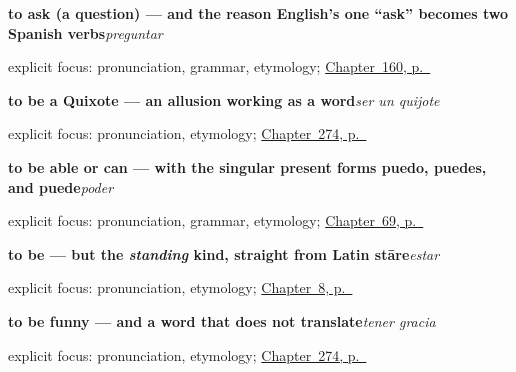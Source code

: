 \noindent\begin{minipage}[t]{\linewidth}
\raggedright
\textbf{to ask (a question) — and the reason English's one \textquotedblleft{}ask\textquotedblright{} becomes two Spanish verbs}\enspace\emph{preguntar}\par
\footnotesize explicit focus: pronunciation, grammar, etymology; \hyperref[ch:spanish-preguntar]{Chapter~160, p.~\pageref*{ch:spanish-preguntar}}
\end{minipage}\par\smallskip

\noindent\begin{minipage}[t]{\linewidth}
\raggedright
\textbf{to be a Quixote — an allusion working as a word}\enspace\emph{ser un quijote}\par
\footnotesize explicit focus: pronunciation, etymology; \hyperref[ch:peso-cultural]{Chapter~274, p.~\pageref*{ch:peso-cultural}}
\end{minipage}\par\smallskip

\noindent\begin{minipage}[t]{\linewidth}
\raggedright
\textbf{to be able or can — with the singular present forms puedo, puedes, and puede}\enspace\emph{poder}\par
\footnotesize explicit focus: pronunciation, grammar, etymology; \hyperref[ch:stem-changes]{Chapter~69, p.~\pageref*{ch:stem-changes}}
\end{minipage}\par\smallskip

\noindent\begin{minipage}[t]{\linewidth}
\raggedright
\textbf{to be — but the \emph{standing} kind, straight from Latin stāre}\enspace\emph{estar}\par
\footnotesize explicit focus: pronunciation, etymology; \hyperref[ch:how-are-you]{Chapter~8, p.~\pageref*{ch:how-are-you}}
\end{minipage}\par\smallskip

\noindent\begin{minipage}[t]{\linewidth}
\raggedright
\textbf{to be funny — and a word that does not translate}\enspace\emph{tener gracia}\par
\footnotesize explicit focus: pronunciation, etymology; \hyperref[ch:peso-cultural]{Chapter~274, p.~\pageref*{ch:peso-cultural}}
\end{minipage}\par\smallskip

